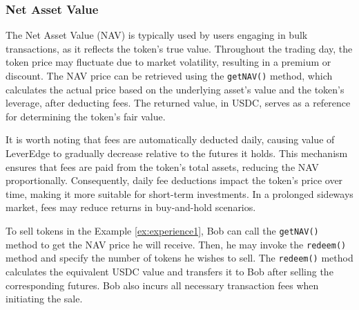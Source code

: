 \subsubsection{Net Asset Value}
The Net Asset Value (NAV) is typically used by users engaging in bulk transactions, as it reflects the token's true value. Throughout the trading day, the token price may fluctuate due to market volatility, resulting in a premium or discount. The NAV price can be retrieved using the \texttt{getNAV()} method, which calculates the actual price based on the underlying asset's value and the token's leverage, after deducting fees. The returned value, in USDC, serves as a reference for determining the token's fair value. 

It is worth noting that fees are automatically deducted daily, causing value of LeverEdge to gradually decrease relative to the futures it holds. This mechanism ensures that fees are paid from the token's total assets, reducing the NAV proportionally. Consequently, daily fee deductions impact the token's price over time, making it more suitable for short-term investments. In a prolonged sideways market, fees may reduce returns in buy-and-hold scenarios.

\begin{example}
	To sell tokens in the Example \ref{ex:experience1}, Bob can call the \texttt{getNAV()} method to get the NAV price he will receive. Then, he may invoke the \texttt{redeem()} method and specify the number of tokens he wishes to sell. The \texttt{redeem()} method calculates the equivalent USDC value and transfers it to Bob after selling the corresponding futures. Bob also incurs all necessary transaction fees when initiating the sale.
\end{example}

